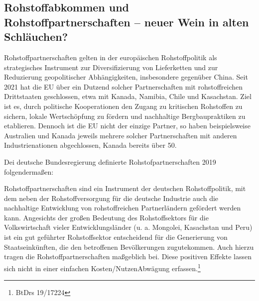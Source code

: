 \documentclass[12pt,a4paper,oneside]{book} %
\begin{document}






\subsection{Rohstoffabkommen und Rohstoffpartnerschaften -- neuer Wein in alten Schläuchen?}
Rohstoffpartnerschaften gelten in der europäischen Rohstoffpolitik als strategisches Instrument zur Diversifizierung von Lieferketten und zur Reduzierung geopolitischer Abhängigkeiten, insbesondere gegenüber China. Seit 2021 hat die EU über ein Dutzend solcher Partnerschaften mit rohstoffreichen Drittstaaten geschlossen, etwa mit Kanada, Namibia, Chile und Kasachstan. Ziel ist es, durch politische Kooperationen den Zugang zu kritischen Rohstoffen zu sichern, lokale Wertschöpfung zu fördern und nachhaltige Bergbaupraktiken zu etablieren. Dennoch ist die EU nicht der einzige Partner, so haben beispielsweise Australien und Kanada jeweils mehrere solcher Partnerschaften mit anderen Industrienationen abgechlossen, Kanada bereits über 50.

Dei deutsche Bundesregierung definierte Rohstofpartnerschaften 2019 folgendermaßen:

\glqq Rohstoffpartnerschaften sind ein Instrument der deutschen Rohstoffpolitik, mit dem neben der Rohstoffversorgung für die deutsche Industrie auch die nachhaltige Entwicklung von rohstoffreichen Partnerländern gefördert werden kann. Angesichts der großen Bedeutung des Rohstoffsektors für die Volkswirtschaft vieler Entwicklungsländer (u. a. Mongolei, Kasachstan und Peru) ist ein gut geführter Rohstoffsektor entscheidend für die Generierung von Staatseinkünften, die den betroffenen Bevölkerungen zugutekommen. Auch hierzu tragen die Rohstoffpartnerschaften maßgeblich bei. Diese positiven Effekte lassen sich nicht in einer einfachen Kosten/NutzenAbwägung erfassen.\grqq \footnote{BtDrs 19/17224}
\end{document}
